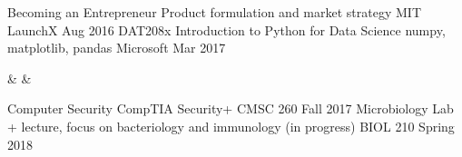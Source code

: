 


\begin{additionaleducation}
  \cvdateitem
    {Becoming an Entrepreneur} %
    {Product formulation and market strategy} %
    {MIT LaunchX} %
    {Aug 2016} %
   \cvdateitem
    {DAT208x Introduction to Python for Data Science} %
    {numpy, matplotlib, pandas} %
    {Microsoft} %
    {Mar 2017} %
\end{additionaleducation}





\begin{additionaleducation}
   &  &  \\
\end{additionaleducation}





\begin{additionaleducation}
  \cvdateitem
    {Computer Security} %
    {CompTIA Security+} %
    {CMSC 260} %
    {Fall 2017} %
   \cvdateitem
    {Microbiology} %
    {Lab + lecture, focus on bacteriology and immunology (in progress)} %
    {BIOL 210} %
    {Spring 2018} %
\end{additionaleducation}

